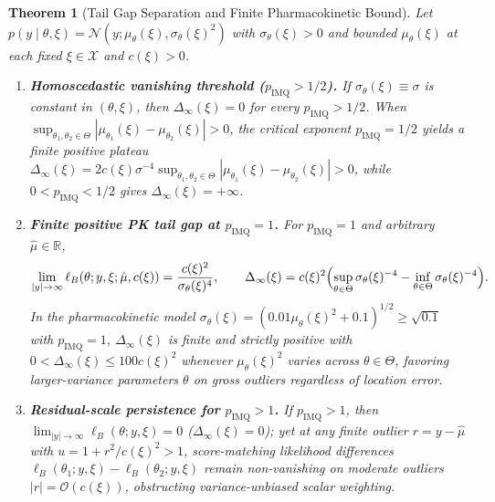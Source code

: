 \documentclass[11pt,a4paper,reqno]{amsart}
\newtheorem{theorem}{Theorem}[section]
\theoremstyle{definition}
\theoremstyle{remark}
\newcommand{\R}{\mathbb{R}}
\newcommand{\Ncal}{\mathcal{N}}
\newcommand{\Xcal}{\mathcal{X}}
\begin{document}
\begin{theorem}[Tail Gap Separation and Finite Pharmacokinetic Bound]\label{thm:heteroscedastic}
Let $p(y \mid \theta, \xi) = \Ncal(y; \mu_\theta(\xi), \sigma_\theta(\xi)^2)$ with $\sigma_\theta(\xi) > 0$ and bounded $\mu_\theta(\xi)$ at each fixed $\xi \in \Xcal$ and $c(\xi) > 0$.
\begin{enumerate}[label=(\alph*)]
\item \textbf{Homoscedastic vanishing threshold ($p_{\mathrm{IMQ}} > 1/2$).} If $\sigma_\theta(\xi) \equiv \sigma$ is constant in $(\theta, \xi)$, then $\Delta_\infty(\xi) = 0$ for every $p_{\mathrm{IMQ}} > 1/2$. When $\sup_{\theta_1, \theta_2 \in \Theta}|\mu_{\theta_1}(\xi) - \mu_{\theta_2}(\xi)| > 0$, the critical exponent $p_{\mathrm{IMQ}} = 1/2$ yields a finite positive plateau $\Delta_\infty(\xi) = 2 c(\xi)\sigma^{-4}\sup_{\theta_1,\theta_2 \in \Theta}|\mu_{\theta_1}(\xi) - \mu_{\theta_2}(\xi)| > 0$, while $0 < p_{\mathrm{IMQ}} < 1/2$ gives $\Delta_\infty(\xi) = +\infty$.
\item \textbf{Finite positive PK tail gap at $p_{\mathrm{IMQ}} = 1$.} For $p_{\mathrm{IMQ}} = 1$ and arbitrary $\hat{\mu} \in \R$,
\[
\lim_{|y| \to \infty} \ell_B(\theta; y, \xi; \hat{\mu}, c(\xi)) = \frac{c(\xi)^2}{\sigma_\theta(\xi)^4}, \qquad
\Delta_\infty(\xi) = c(\xi)^2\Bigl(\sup_{\theta \in \Theta} \sigma_\theta(\xi)^{-4} - \inf_{\theta \in \Theta} \sigma_\theta(\xi)^{-4}\Bigr).
\]
In the pharmacokinetic model $\sigma_\theta(\xi) = (0.01 \mu_\theta(\xi)^2 + 0.1)^{1/2} \ge \sqrt{0.1}$ with $p_{\mathrm{IMQ}} = 1$, $\Delta_\infty(\xi)$ is finite and strictly positive with $0 < \Delta_\infty(\xi) \le 100 c(\xi)^2$ whenever $\mu_\theta(\xi)^2$ varies across $\theta \in \Theta$, favoring larger-variance parameters $\theta$ on gross outliers regardless of location error.
\item \textbf{Residual-scale persistence for $p_{\mathrm{IMQ}} > 1$.} If $p_{\mathrm{IMQ}} > 1$, then $\lim_{|y|\to\infty}\ell_B(\theta; y, \xi) = 0$ ($\Delta_\infty(\xi) = 0$); yet at any finite outlier $r = y - \hat{\mu}$ with $u = 1 + r^2/c(\xi)^2 > 1$, score-matching likelihood differences $\ell_B(\theta_1; y, \xi) - \ell_B(\theta_2; y, \xi)$ remain non-vanishing on moderate outliers $|r| = \mathcal{O}(c(\xi))$, obstructing variance-unbiased scalar weighting.
\end{enumerate}
\end{theorem}
\end{document}
